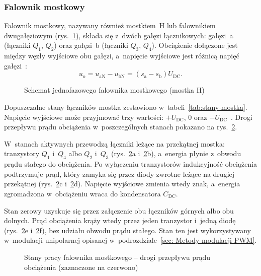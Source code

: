 \subsubsection*{Falownik mostkowy}

Falownik mostkowy, nazywany również mostkiem~H lub falownikiem dwugałęziowym
(rys.~\ref{fig:mostek-h}), składa się z~dwóch gałęzi łącznikowych:
gałęzi~a (łączniki $Q_1$, $Q_2$) oraz gałęzi~b (łączniki $Q_3$, $Q_4$).
Obciążenie dołączone jest między węzły wyjściowe obu gałęzi, a~napięcie
wyjściowe jest różnicą napięć gałęzi~\cite[s.~194]{mohan2012}:
\begin{equation}
  u_\mathrm{o} = u_\mathrm{aN} - u_\mathrm{bN}
  = \left(s_\mathrm{a} - s_\mathrm{b}\right) U_\mathrm{DC}.
  \label{eq:mostek}
\end{equation}

\begin{figure}[htbp]
  \centering
  
  \caption{Schemat jednofazowego falownika mostkowego (mostka H)}
  \label{fig:mostek-h}
\end{figure}

Dopuszczalne stany łączników mostka zestawiono w~tabeli~\ref{tab:stany-mostka}.
Napięcie wyjściowe może przyjmować trzy wartości: $+U_\mathrm{DC}$, $0$
oraz $-U_\mathrm{DC}$~\cite[s.~5]{instrukcja}. Drogi przepływu prądu
obciążenia w~poszczególnych stanach pokazano na rys.~\ref{fig:mostek-stany}.

W~stanach aktywnych przewodzą łączniki leżące na przekątnej mostka:
tranzystory $Q_1$ i~$Q_4$ albo $Q_2$ i~$Q_3$ (rys.~\ref{fig:mostek-stany}a
i~\ref{fig:mostek-stany}b), a~energia płynie z~obwodu prądu stałego do
obciążenia. Po wyłączeniu tranzystorów indukcyjność obciążenia podtrzymuje
prąd, który zamyka się przez diody zwrotne leżące na drugiej przekątnej
(rys.~\ref{fig:mostek-stany}c i~\ref{fig:mostek-stany}d). Napięcie wyjściowe
zmienia wtedy znak, a~energia zgromadzona w~obciążeniu wraca do kondensatora
$C_\mathrm{DC}$.

Stan zerowy uzyskuje się przez załączenie obu łączników górnych albo obu
dolnych. Prąd obciążenia krąży wtedy przez jeden tranzystor i~jedną diodę
(rys.~\ref{fig:mostek-stany}e i~\ref{fig:mostek-stany}f), bez udziału obwodu
prądu stałego. Stan ten jest wykorzystywany w~modulacji unipolarnej opisanej
w~podrozdziale~\ref{sec: Metody modulacji PWM}.

\begin{figure}[p]
  \centering
  
  \caption{Stany pracy falownika mostkowego -- drogi przepływu prądu
    obciążenia (zaznaczone na czerwono)}
  \label{fig:mostek-stany}
\end{figure}

